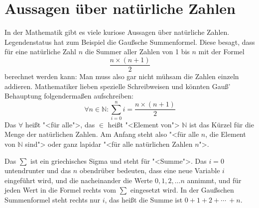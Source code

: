 



\section{Aussagen über natürliche Zahlen}
\label{sec:mathematical-induction}
\label{sec:gausssche-summenformel}

In der Mathematik gibt es viele kuriose Aussagen über natürliche
Zahlen.  Legendenstatus hat zum Beispiel die Gaußsche
Summenformel.  Diese besagt, dass für
eine natürliche Zahl $n$ die Summer aller Zahlen von 1 bis $n$ mit der
Formel
\[\frac{n\times (n+1)}{2}\]
berechnet werden kann: Man muss also gar nicht mühsam die Zahlen
einzeln addieren.  Mathematiker lieben spezielle Schreibweisen und
könnten Gauß' Behauptung folgendermaßen aufschreiben:
%
\[\forall n\in\mathbb{N}: \sum_{i=0}^n i =
  \frac{n\times (n+1)}{2}\]
%
Das $\forall$ heißt "<für alle">, das $\in$ heißt "<Element von">
$\mathbb{N}$ ist das Kürzel für die Menge der natürlichen Zahlen.
Am Anfang steht also "<für alle $n$, die Element von $\mathbb{N}$
sind"> oder ganz lapidar "<für alle natürlichen Zahlen $n$">.

Das $\sum$ ist ein griechisches Sigma und steht für "<Summe">.  Das
$i=0$ untendrunter und das $n$ obendrüber bedeuten, dass eine neue
Variable $i$ eingeführt wird, und die nacheinander die Werte $0, 1, 2,
\ldots n$ annimmt, und für jeden Wert in die Formel rechts vom $\sum$
eingesetzt wird.  In der Gaußschen Summenformel steht rechts nur 
$i$, das heißt die Summe ist $0 + 1 + 2 + \cdots \ + n$.

